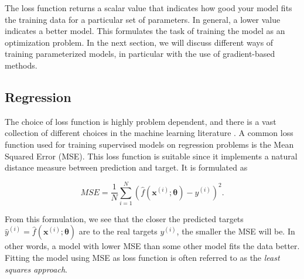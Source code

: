 The loss function returns a scalar value that indicates how good your model fits the training data for a particular set of parameters. In general, a lower value indicates a better model. This formulates the task of training the model as an optimization problem. In the next section, we will discuss different ways of training parameterized models, in particular with the use of gradient-based methods.

\subsection{Regression}\label{sec:Regression}

The choice of loss function is highly problem dependent, and there is a vast collection of different choices in the machine learning literature \cite{hastie01statisticallearning}. A common loss function used for training supervised models on regression problems is the Mean Squared Error (MSE). This loss function is suitable since it implements a natural distance measure between prediction and target. It is formulated as

\begin{equation}\label{eq:MSE}
    MSE = \frac{1}{N}\sum_{i=1}^{N} (\hat{f}(\boldsymbol{x}^{(i)}; \boldsymbol{\theta}) - y^{(i)})^2.
\end{equation}

From this formulation, we see that the closer the predicted targets $\hat{y}^{(i)} = \hat{f}(\boldsymbol{x}^{(i)}; \boldsymbol{\theta})$ are to the real targets $y^{(i)}$, the smaller the MSE will be. In other words, a model with lower MSE than some other model fits the data better. Fitting the model using MSE as loss function is often referred to as the \emph{least squares approach}.

